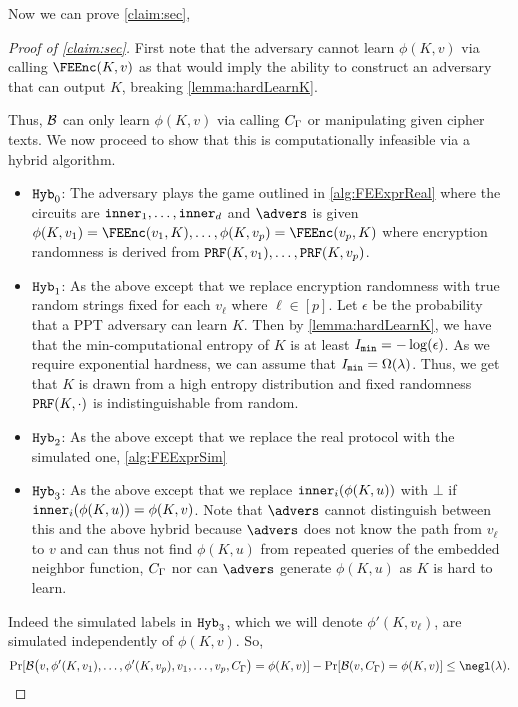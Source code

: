 Now we can prove \cref{claim:sec},
\begin{proof}[Proof of \cref{claim:sec}]
First note that the adversary cannot learn $\phi(K, v)$ via calling $\FEEnc(K, v)$ as
that would imply the ability to construct an adversary that can output $K$, breaking \cref{lemma:hardLearnK}.

Thus, $\mathcal{B}$ can only learn $\phi(K, v)$ via calling $C_\Gamma$ or manipulating given cipher texts.
We now proceed to show that this is computationally infeasible via a hybrid algorithm.

\begin{itemize}
	\item $\texttt{Hyb}_0$: The adversary plays the game outlined in \cref{alg:FEExprReal} where the circuits are $\texttt{inner}_1, \dots, \texttt{inner}_d$
	and $\advers$ is given $\phi(K, v_1) = \FEEnc(v_1, K), \dots, \phi(K, v_p) = \FEEnc(v_p, K)$ where encryption randomness is derived from $\texttt{PRF}(K, v_1), \dots, \texttt{PRF}(K, v_p)$.
	\item $\texttt{Hyb}_1$: As the above except that we replace encryption randomness with true random strings fixed for each $v_\ell$ where $\ell \in [p]$.
	Let $\epsilon$ be the probability that a PPT adversary can learn $K$. Then by \cref{lemma:hardLearnK}, 
	we have that the min-computational entropy of $K$ is at least $I_\texttt{min} = -\log(\epsilon)$.
	As we require exponential hardness, we can assume that $I_\texttt{min} = \Omega(\lambda)$. Thus, we get
	that $K$ is drawn from a high entropy distribution and fixed randomness $\texttt{PRF}(K, \cdot)$ is indistinguishable from random.
	\item $\texttt{Hyb}_2$: As the above except that we replace the real protocol with the simulated one, \cref{alg:FEExprSim}
	\item $\texttt{Hyb}_3$: As the above except that we replace $\texttt{inner}_i(\phi(K, u))$ with $\bot$ if $\texttt{inner}_i(\phi(K, u)) = \phi(K, v)$.
	Note that $\advers$ cannot distinguish between this and the above hybrid
	because $\advers$ does not know the path from $v_\ell$ to $v$
	and can thus not find $\phi(K, u)$ from repeated queries of the embedded neighbor function, $C_\Gamma$
	nor can $\advers$ generate $\phi(K, u)$ as $K$ is hard to learn.
\end{itemize}

Indeed the simulated labels in $\texttt{Hyb}_3$, which we will denote $\phi'(K, v_\ell)$, are simulated independently of $\phi(K, v)$.
So,
\begin{equation*}
		\Pr[\adversB\big(v, \phi'(K, v_1), \dots, \phi'(K, v_p), v_1, \dots, v_p, \circNeigb\big) = \phi(K, v)]
			 - \Pr[\adversB(v, \circNeigb) = \phi(K, v)]
	\leq \negl(\lambda).
\end{equation*}


\end{proof}
